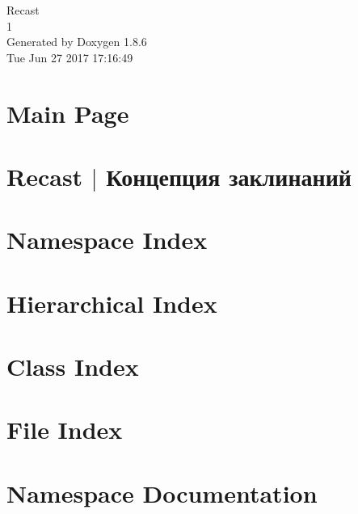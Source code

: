 \documentclass[twoside]{book}
\newcommand{\clearemptydoublepage}{%
  \newpage{\pagestyle{empty}\cleardoublepage}%
}
\begin{document}
\hypersetup{pageanchor=false}
\begin{titlepage}
\vspace*{7cm}
\begin{center}%
{\Large Recast \\[1ex]\large 1 }\\
\vspace*{1cm}
{\large Generated by Doxygen 1.8.6}\\
\vspace*{0.5cm}
{\small Tue Jun 27 2017 17:16:49}\\
\end{center}
\end{titlepage}
\clearemptydoublepage
\tableofcontents
\clearemptydoublepage
{}
\hypersetup{pageanchor=true}

\chapter{Main Page}
\label{index}\hypertarget{index}{}
\chapter{Recast $\vert$ Концепция заклинаний}
\label{md_custom-docs__nodes}
\hypertarget{md_custom-docs__nodes}{}

\chapter{Namespace Index}

\chapter{Hierarchical Index}

\chapter{Class Index}

\chapter{File Index}

\chapter{Namespace Documentation}
























\end{document}
